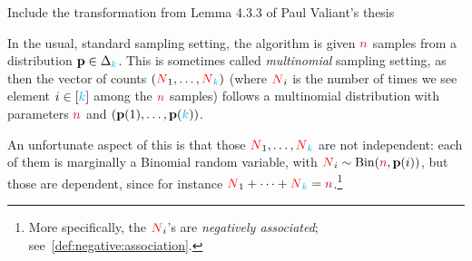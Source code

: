 \tbc
Include the transformation from Lemma 4.3.3 of Paul Valiant's thesis

In the usual, standard sampling setting, the algorithm is given ${\textcolor{purple}{n}}$ \iid samples from a distribution $\mathbf{p}\in\Delta_{{\textcolor{cyan}{k}}}$. This is sometimes called \emph{multinomial} sampling setting, as then the vector of counts $(\textcolor{red}{N}_1,\dots,\textcolor{red}{N}_{\textcolor{cyan}{k}})$ (where $\textcolor{red}{N}_i$ is the number of times we see element $i\in[{\textcolor{cyan}{k}}]$ among the ${\textcolor{purple}{n}}$ samples) follows a multinomial distribution with parameters ${\textcolor{purple}{n}}$ and $(\mathbf{p}(1),\dots,\mathbf{p}({\textcolor{cyan}{k}}))$.

An unfortunate aspect of this is that those $\textcolor{red}{N}_1,\dots,\textcolor{red}{N}_{\textcolor{cyan}{k}}$ are not independent: each of them is marginally a Binomial random variable, with $\occur_i \sim \binomial{\ns}{\p(i)}$, but those are dependent, since for instance $\textcolor{red}{N}_1+\dots+\textcolor{red}{N}_{\textcolor{cyan}{k}}={\textcolor{purple}{n}}$.\footnote{More specifically, the $\textcolor{red}{N}_i$'s are \emph{negatively associated}; see~\cref{def:negative:association}.}